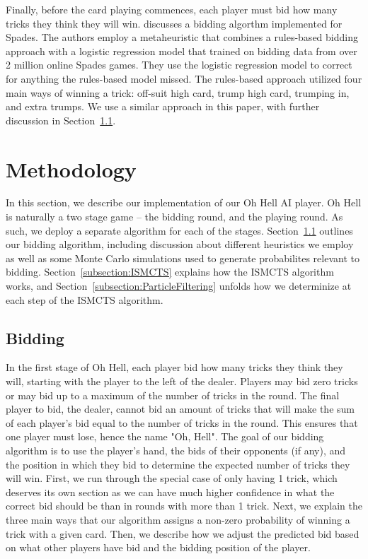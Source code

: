 \documentclass{article}
\begin{document}
Finally, before the card playing commences, each player must bid how many tricks they think they will win. \citet{cohensius2019bidding} discusses a bidding algorthm implemented for Spades. 
The authors employ a metaheuristic that combines a rules-based bidding approach with a logistic regression model that trained on bidding data from over 2 million online Spades games. They use the logistic regression model to correct for anything the rules-based model missed. The rules-based approach utilized four main ways of winning a trick: off-suit high card, trump high card, trumping in, and extra trumps. We use a similar approach in this paper, with further discussion in Section~\ref{subsection:Bidding}.

\section{Methodology}
\label{section:Methodology}
In this section, we describe our implementation of our Oh Hell AI player. Oh Hell is naturally a two stage game -- the bidding round, and the playing round. As such, we deploy a separate algorithm for each of the stages. Section~\ref{subsection:Bidding} outlines our bidding algorithm, including discussion about different heuristics we employ as well as some Monte Carlo simulations used to generate probabilites relevant to bidding.
Section~\ref{subsection:ISMCTS} explains how the ISMCTS algorithm works, and Section~\ref{subsection:ParticleFiltering} unfolds how we determinize at each step of the ISMCTS algorithm.
\subsection{Bidding}
\label{subsection:Bidding}
In the first stage of Oh Hell, each player bid how many tricks they think they will, starting with the player to the left of the dealer. Players may bid zero tricks or may bid up to a maximum of the number of tricks in the round. 
The final player to bid, the dealer, cannot bid an amount of tricks that will make the sum of each player's bid equal to the number of tricks in the round. This ensures that one player must lose, hence the name "Oh, Hell".
The goal of our bidding algorithm is to use the player's hand, the bids of their opponents (if any), and the position in which they bid to determine the expected number of tricks they will win. 
First, we run through the special case of only having 1 trick, which deserves its own section as we can have much higher confidence in what the correct bid should be than in rounds with more than 1 trick. Next, we explain the three main ways that our algorithm assigns a non-zero probability of winning a trick with a given card. Then, we describe how we adjust the predicted bid based on what other players have bid and the bidding position of the player.
\end{document}

